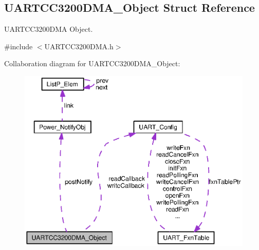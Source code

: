 \subsection{U\+A\+R\+T\+C\+C3200\+D\+M\+A\+\_\+\+Object Struct Reference}
\label{struct_u_a_r_t_c_c3200_d_m_a___object}


U\+A\+R\+T\+C\+C3200\+D\+M\+A Object.  




{\ttfamily \#include $<$U\+A\+R\+T\+C\+C3200\+D\+M\+A.\+h$>$}



Collaboration diagram for U\+A\+R\+T\+C\+C3200\+D\+M\+A\+\_\+\+Object\+:
\nopagebreak
\begin{figure}[H]
\begin{center}
\leavevmode
\includegraphics[width=350pt]{struct_u_a_r_t_c_c3200_d_m_a___object__coll__graph}
\end{center}
\end{figure}
